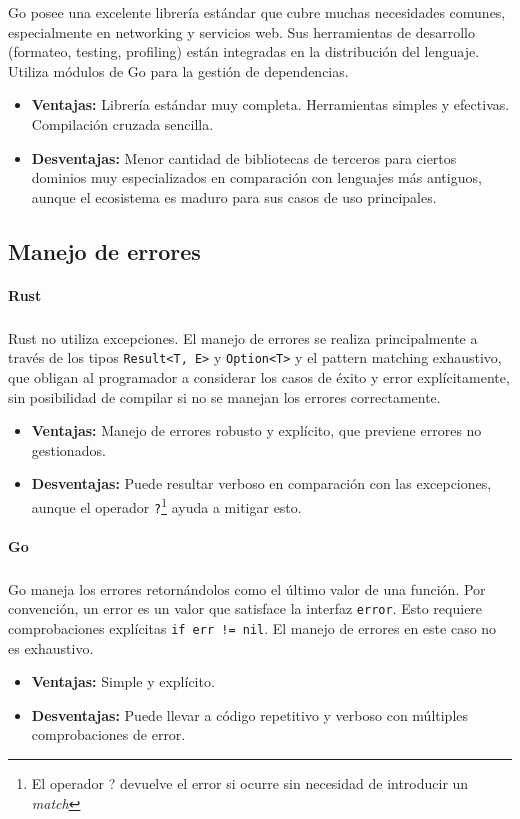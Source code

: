 Go posee una excelente librería estándar que cubre muchas necesidades comunes, especialmente en networking y servicios web. Sus herramientas de desarrollo (formateo, testing, profiling) están integradas en la distribución del lenguaje. Utiliza módulos de Go para la gestión de dependencias.
\begin{itemize}
    \item \textbf{Ventajas:} Librería estándar muy completa. Herramientas simples y efectivas. Compilación cruzada sencilla.
    \item \textbf{Desventajas:} Menor cantidad de bibliotecas de terceros para ciertos dominios muy especializados en comparación con lenguajes más antiguos, aunque el ecosistema es maduro para sus casos de uso principales.
\end{itemize}

\subsection{Manejo de errores}
\paragraph{Rust}
\subparagraph{}
Rust no utiliza excepciones. El manejo de errores se realiza principalmente a través de los tipos \texttt{Result<T, E>} y \texttt{Option<T>} y el pattern matching exhaustivo, que obligan al programador a considerar los casos de éxito y error explícitamente, sin posibilidad de compilar si no se manejan los errores correctamente.
\begin{itemize}
    \item \textbf{Ventajas:} Manejo de errores robusto y explícito, que previene errores no gestionados.
    \item \textbf{Desventajas:} Puede resultar verboso en comparación con las excepciones, aunque el operador \texttt{?}\footnote{El operador ? devuelve el error si ocurre sin necesidad de introducir un \textit{match}} ayuda a mitigar esto.
\end{itemize}

\paragraph{Go}
\subparagraph{}
Go maneja los errores retornándolos como el último valor de una función. Por convención, un error es un valor que satisface la interfaz \texttt{error}. Esto requiere comprobaciones explícitas \texttt{if err != nil}.
El manejo de errores en este caso no es exhaustivo.
\begin{itemize}
    \item \textbf{Ventajas:} Simple y explícito.
    \item \textbf{Desventajas:} Puede llevar a código repetitivo y verboso con múltiples comprobaciones de error.
\end{itemize}

